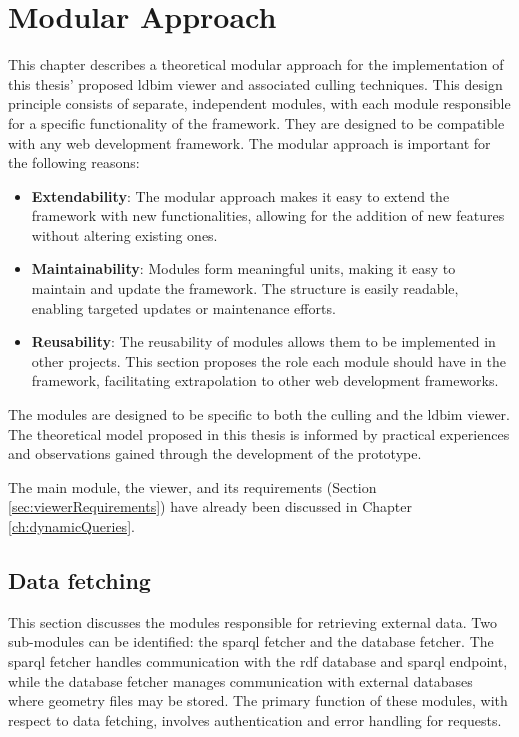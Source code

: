 \chapter{Modular Approach} \label{ch:modularApproach}

This chapter describes a theoretical modular approach for the implementation of this thesis' proposed \ac{ldbim} viewer and associated culling techniques. This design principle consists of separate, independent modules, with each module responsible for a specific functionality of the framework. They are designed to be compatible with any web development framework. The modular approach is important for the following reasons:

\begin{itemize}
  \item \textbf{Extendability}: The modular approach makes it easy to extend the framework with new functionalities, allowing for the addition of new features without altering existing ones.
  \item \textbf{Maintainability}: Modules form meaningful units, making it easy to maintain and update the framework. The structure is easily readable, enabling targeted updates or maintenance efforts.
  \item \textbf{Reusability}: The reusability of modules allows them to be implemented in other projects. This section proposes the role each module should have in the framework, facilitating extrapolation to other web development frameworks.
\end{itemize}

The modules are designed to be specific to both the culling and the \ac{ldbim} viewer. The theoretical model proposed in this thesis is informed by practical experiences and observations gained through the development of the prototype.

The main module, the viewer, and its requirements (Section \ref{sec:viewerRequirements}) have already been discussed in Chapter \ref{ch:dynamicQueries}.

\section{Data fetching}
This section discusses the modules responsible for retrieving external data. Two sub-modules can be identified: the \ac{sparql} fetcher and the database fetcher. The \ac{sparql} fetcher handles communication with the \ac{rdf} database and \ac{sparql} endpoint, while the database fetcher manages communication with external databases where geometry files may be stored. The primary function of these modules, with respect to data fetching, involves authentication and error handling for requests.

